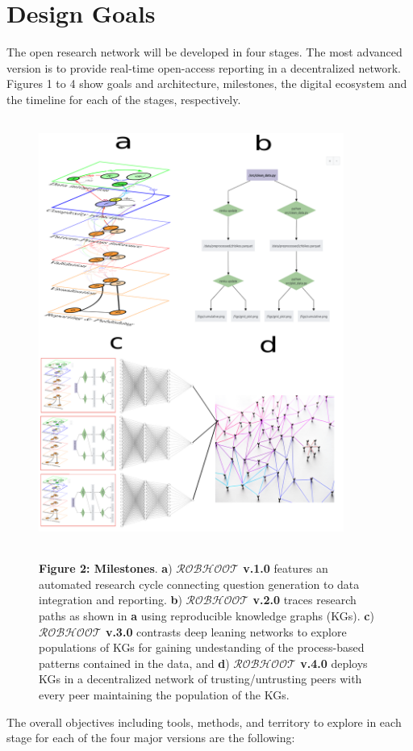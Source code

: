 \documentclass[10pt, a4paper, twocolumn]{article} %
\begin{document}
  \section{Design Goals}
  The open research network will be developed in four stages. The most
  advanced version is to provide real-time open-access reporting in a
  decentralized network. Figures 1 to 4 show goals and architecture,
  milestones, the digital ecosystem and the timeline for each of the
  stages, respectively.
  \begin{figure}[ht]
    \includegraphics[width=10cm,height=14cm]{Figure1.pdf}
    \centering
    
    {\small {\bf Figure 2: Milestones}. {\bf a}) {\bf
        $\mathcal{ROBHOOT}$ v.1.0} features an automated research
      cycle connecting question generation to data integration and
      reporting. {\bf b}) {\bf $\mathcal{ROBHOOT}$ v.2.0} traces
      research paths as shown in {\bf a} using reproducible knowledge
      graphs (KGs). {\bf c}) {\bf $\mathcal{ROBHOOT}$ v.3.0} contrasts
      deep leaning networks to explore populations of KGs for gaining
      undestanding of the process-based patterns contained in the
      data, and {\bf d}) {\bf $\mathcal{ROBHOOT}$ v.4.0} deploys KGs
      in a decentralized network of trusting/untrusting peers with
      every peer maintaining the population of the KGs.}
 \end{figure}
  The overall objectives including tools, methods, and territory to
  explore in each stage for each of the four major versions are the
  following:
\end{document}
